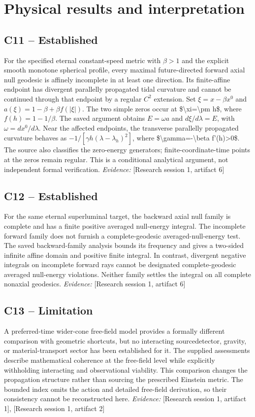 \documentclass[11pt]{article}
\begin{document}
\section{Physical results and interpretation}
\begin{sloppypar}
\small
\subsection{C11 -- Established}
For the specified eternal constant-speed metric with $\beta>1$ and the explicit smooth monotone spherical profile, every maximal future-directed forward axial null geodesic is affinely incomplete in at least one direction. Its finite-affine endpoint has divergent parallelly propagated tidal curvature and cannot be continued through that endpoint by a regular $C^2$ extension.
Set $\xi=x-\beta x^0$ and $a(\xi)=1-\beta+\beta f(|\xi|)$. The two simple zeros occur at \$\textbackslash{}xi=\textbackslash{}pm h\$, where $f(h)=1-1/\beta$. The saved argument obtains $E=\omega a$ and $d\xi/d\lambda=E$, with $\omega=dx^0/d\lambda$. Near the affected endpoints, the transverse parallelly propagated curvature behaves as $-1/[\gamma h(\lambda-\lambda_h)^2]$, where \$\textbackslash{}gamma=-\textbackslash{}beta f'(h)\textgreater{}0\$. The source also classifies the zero-energy generators; finite-coordinate-time points at the zeros remain regular. This is a conditional analytical argument, not independent formal verification.
\textit{Evidence: }[Research session 1, artifact 6]
\subsection{C12 -- Established}
For the same eternal superluminal target, the backward axial null family is complete and has a finite positive averaged null-energy integral. The incomplete forward family does not furnish a complete-geodesic averaged-null-energy test.
The saved backward-family analysis bounds its frequency and gives a two-sided infinite affine domain and positive finite integral. In contrast, divergent negative integrals on incomplete forward rays cannot be designated complete-geodesic averaged null-energy violations. Neither family settles the integral on all complete nonaxial geodesics.
\textit{Evidence: }[Research session 1, artifact 6]
\subsection{C13 -- Limitation}
A preferred-time wider-cone free-field model provides a formally different comparison with geometric shortcuts, but no interacting source\textendash{}detector, gravity, or material-transport sector has been established for it.
The supplied assessments describe mathematical coherence at the free-field level while explicitly withholding interacting and observational viability. This comparison changes the propagation structure rather than sourcing the prescribed Einstein metric. The bounded index omits the action and detailed free-field derivation, so their consistency cannot be reconstructed here.
\textit{Evidence: }[Research session 1, artifact 1], [Research session 1, artifact 2]

\end{sloppypar}
\end{document}
